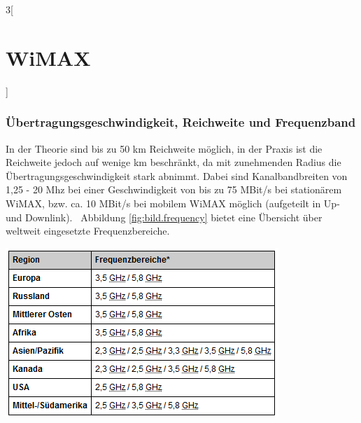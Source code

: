 \begin{multicols}{3}[\section{WiMAX}]
\subsubsection*{Übertragungsgeschwindigkeit, Reichweite und Frequenzband}
In der Theorie sind bis zu 50 km Reichweite möglich, in der Praxis ist die Reichweite jedoch auf wenige km beschränkt, da mit zunehmenden Radius die Übertragungsgeschwindigkeit stark abnimmt. Dabei sind Kanalbandbreiten von 1,25 - 20 Mhz bei einer Geschwindigkeit von bis zu 75 MBit/s bei stationärem WiMAX, bzw. ca. 10 MBit/s bei mobilem WiMAX möglich (aufgeteilt in Up- und Downlink).~\cite{wmx.1}
Abbildung \ref{fig:bild.frequency} bietet eine Übersicht über weltweit eingesetzte Frequenzbereiche.
\begin{Figure}
	\includegraphics[width=\linewidth]{Kapitel/WiMAX/Grafiken/Frequenztabelle.png}
	\label{fig:bild.frequency}
\end{Figure}

\end{multicols}
\newpage
